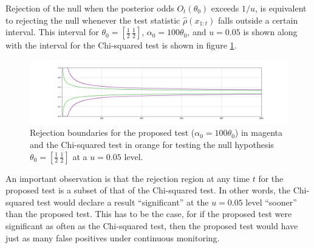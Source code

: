 \documentclass[11pt]{article}
\begin{document}
  Rejection of the null when the posterior odds $O_t(\theta_0)$ exceeds $1/u$, is equivalent to rejecting the null whenever the test statistic $\hat{\rho}(x_{1:t})$ falls outside a certain interval. This interval for $\theta_0 = [\frac{1}{2}\, \frac{1}{2}]$, $\alpha_0 = 100\theta_0 $, and $u=0.05$ is shown along with the interval for the Chi-squared test is shown in figure \ref{fig:critical}.
\begin{figure}[H]
  \centering
  \includegraphics[scale=0.35]{images/critical_regions.png}
  \caption{Rejection boundaries for the proposed test ($\alpha_0 = 100\theta_0$) in magenta and the Chi-squared test in orange for testing the null hypothesis $\theta_0 = [\frac{1}{2} \, \frac{1}{2}]$ at a $u=0.05$ level. }
    \label{fig:critical}
  \end{figure}
  An important observation is that the rejection region at any time $t$ for the proposed test is a subset of that of the Chi-squared test. In other words, the Chi-squared test would declare a result ``significant'' at the $u=0.05$ level ``sooner'' than the proposed test. This has to be the case, for if the proposed test were significant as often as the Chi-squared test, then the proposed test would have just as many false positives under continuous monitoring.
  
\end{document}
